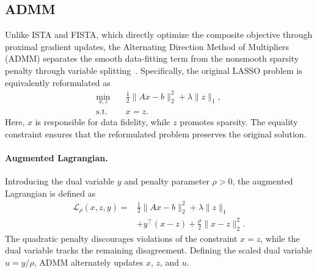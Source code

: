 \documentclass{article}
\begin{document}
\subsection{ADMM}
\label{subsec:admm}

Unlike ISTA and FISTA, which directly optimize the composite
objective through proximal gradient updates, the Alternating
Direction Method of Multipliers (ADMM) separates the smooth
data-fitting term from the nonsmooth sparsity penalty through
variable splitting~\citep{boyd2011}.
Specifically, the original LASSO problem is equivalently
reformulated as
\begin{equation}
\begin{aligned}
\min_{x,z}\quad &
\frac{1}{2}\|Ax-b\|_2^2+\lambda\|z\|_1,\\
\mathrm{s.t.}\quad & x=z.
\end{aligned}
\end{equation}
Here, $x$ is responsible for data fidelity, while $z$
promotes sparsity. The equality constraint ensures that
the reformulated problem preserves the original solution.

\paragraph{Augmented Lagrangian.}
Introducing the dual variable $y$ and penalty parameter
$\rho>0$, the augmented Lagrangian is defined as
\begin{equation}
\begin{aligned}
\mathcal{L}_{\rho}(x,z,y)
=&\frac{1}{2}\|Ax-b\|_2^2+\lambda\|z\|_1\\
&+y^\top(x-z)
+\frac{\rho}{2}\|x-z\|_2^2.
\end{aligned}
\end{equation}
The quadratic penalty discourages violations of the
constraint $x=z$, while the dual variable tracks the
remaining disagreement. Defining the scaled dual variable
$u=y/\rho$, ADMM alternately updates $x$, $z$, and $u$.
\end{document}
